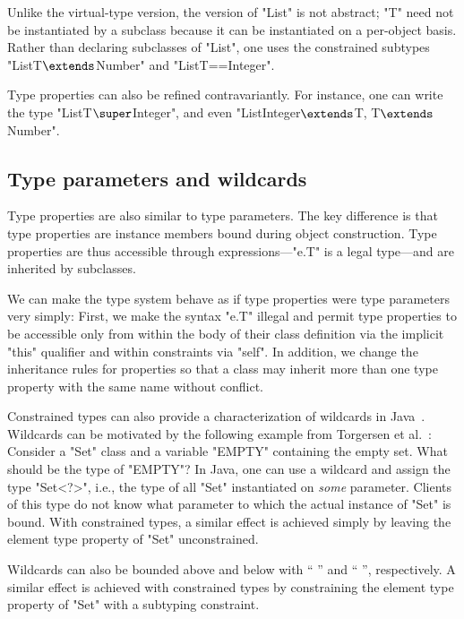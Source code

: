 \noindent
Unlike the virtual-type version,
the \Xten{} version of \xcd"List" is not abstract;
\xcd"T" need not be instantiated by a subclass because it can be
instantiated on a per-object basis.
Rather than declaring subclasses of \xcd"List",
one uses the constrained subtypes
\xcdmath"List{T$\extends$Number}" and \xcd"List{T==Integer}".

Type properties can also be refined contravariantly.
For instance, one can write the type \xcdmath"List{T$\super$Integer}",
and even \xcdmath"List{Integer$\extends$T, T$\extends$Number}".

\subsection{Type parameters and wildcards}
\label{sec:parameters-vs-fields}

Type properties are also similar to type
parameters.  The key difference is that type properties are
instance members bound during object construction.  Type
properties are thus accessible through expressions---\xcd"e.T" is
a legal type---and are inherited by subclasses.

We can make the type system behave as if type properties were
type parameters very simply:  First, we make the syntax \xcd"e.T"
illegal and permit type properties to be accessible only
from within the body of their class definition via the implicit \xcd"this"
qualifier and within constraints via \xcd"self".  In addition,
we change the inheritance rules for properties so that a
class may inherit more than one type property with the same name
without conflict.

Constrained types can also provide a characterization of
wildcards in Java~\cite{Java3,adding-wildcards}.
Wildcards can be motivated
by the following example from Torgersen et al.~\cite{adding-wildcards}:
Consider a \xcd"Set" class and a variable \xcd"EMPTY" containing
the empty set.  What should be the type of \xcd"EMPTY"?
In Java, one can use a wildcard and 
assign the type \xcd"Set<?>", i.e., the type of all \xcd"Set"
instantiated on \emph{some} parameter.  Clients of this
type do not know what parameter to which the actual instance of \xcd"Set"
is bound.
With constrained types,
a similar effect is achieved simply by leaving the
element type property of \xcd"Set" unconstrained.

Wildcards can
also be bounded above and below with
``  '' and ``  '',
respectively.
%
A similar effect is achieved with constrained types by constraining
the
element type property of \xcd"Set" with a subtyping constraint.


